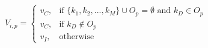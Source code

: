 \documentclass[12pt]{article}
\begin{document}
\[
V_{i,p} = 
\begin{cases}
    v_C,& \text{if } \{k_1, k_2, ..., k_M\} \cup O_p = \emptyset \text{ and } k_D \in O_p\\
    v_C,& \text{if } k_D \notin O_p\\
    v_I,& \text{otherwise}
\end{cases}
\]
\end{document}

